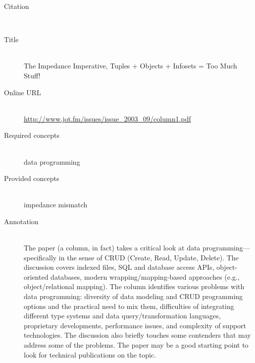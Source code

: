 \begin{description}
\item[Citation]\mbox{}\\
\cite{Thomas03}
\item[Title]\mbox{}\\
The Impedance Imperative, Tuples + Objects + Infosets = Too Much Stuff!
\item[Online URL]\mbox{}\\
{\footnotesize\url{http://www.jot.fm/issues/issue_2003_09/column1.pdf}}
\item[Required concepts]\mbox{}\\
data programming\item[Provided concepts]\mbox{}\\
impedance mismatch\item[Annotation]\mbox{}\\
The paper (a column, in fact) takes a critical look at data programming---specifically in the sense of CRUD (Create, Read, Update, Delete). The discussion covers indexed files, SQL and database access APIs, object-oriented databases, modern wrapping/mapping-based approaches (e.g., object/relational mapping). The column identifies various problems with data programming: diversity of data modeling and CRUD programming options and the practical need to mix them, difficulties of integrating different type systems and data query/transformation languages, proprietary developments, performance issues, and complexity of support technologies. The discussion also briefly touches some contenders that may address some of the problems. The paper may be a good starting point to look for technical publications on the topic.
\end{description}

